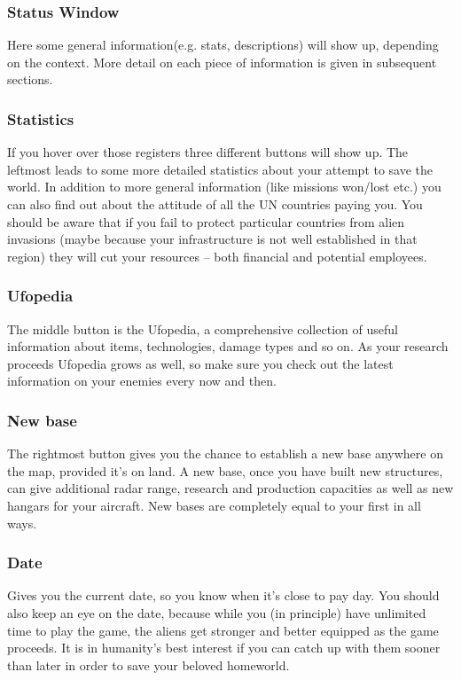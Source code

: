 \newpage

\subsubsection{Status Window}
Here some general information(e.g. stats, descriptions) will show up, depending on the context. More detail on each piece of information is given in subsequent sections.
\subsubsection{Statistics}
If you hover over those registers three different buttons will show up. The leftmost leads to some more detailed statistics about your attempt to save the world. In addition to more general information (like missions won/lost etc.) you can also find out about the attitude of all the UN countries paying you. You should be aware that if you fail to protect particular countries from alien invasions (maybe because your infrastructure is not well established in that region) they will cut your resources -- both financial and potential employees.
\subsubsection{Ufopedia}
The middle button is the Ufopedia, a comprehensive collection of useful information about items, technologies, damage types and so on. As your research proceeds Ufopedia grows as well, so make sure you check out the latest information on your enemies every now and then.
\subsubsection{New base}
The rightmost button gives you the chance to establish a new base anywhere on the map, provided it's on land. A new base, once you have built new structures, can give additional radar range, research and production capacities as well as new hangars for your aircraft.  New bases are completely equal to your first in all ways.
\subsubsection{Date}
Gives you the current date, so you know when it's close to pay day. You should also keep an eye on the date, because while you (in principle) have unlimited time to play the game, the aliens get stronger and better equipped as the game proceeds. It is in humanity's best interest if you can catch up with them sooner than later in order to save your beloved homeworld.
